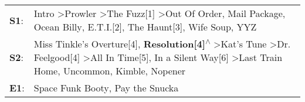 \begin{supertabular}{p{0.03\textwidth}p{0.92\textwidth}}
 \textbf{S1}:  &                                                                       Intro\textsuperscript{} \textgreater \enspace Prowler\textsuperscript{} \textgreater \enspace The Fuzz[1]\textsuperscript{} \textgreater \enspace Out Of Order\textsuperscript{}, \enspace Mail Package\textsuperscript{}, \enspace Ocean Billy\textsuperscript{}, \enspace E.T.I.[2]\textsuperscript{}, \enspace The Haunt[3]\textsuperscript{}, \enspace Wife Soup\textsuperscript{}, \enspace YYZ\textsuperscript{}  \enspace  \\
 \textbf{S2}:  &  Miss Tinkle's Overture[4]\textsuperscript{}, \enspace \textbf{Resolution[4]\textsuperscript{$\wedge$}} \textgreater \enspace Kat's Tune\textsuperscript{} \textgreater \enspace Dr. Feelgood[4]\textsuperscript{} \textgreater \enspace All In Time[5]\textsuperscript{}, \enspace In a Silent Way[6]\textsuperscript{} \textgreater \enspace Last Train Home\textsuperscript{}, \enspace Uncommon\textsuperscript{}, \enspace Kimble\textsuperscript{}, \enspace Nopener\textsuperscript{}  \enspace  \\
 \textbf{E1}:  &                                                                                                                                                                                                                                                                                                                                                                                                                Space Funk Booty\textsuperscript{}, \enspace Pay the Snucka\textsuperscript{}  \enspace  \\
\end{supertabular}
